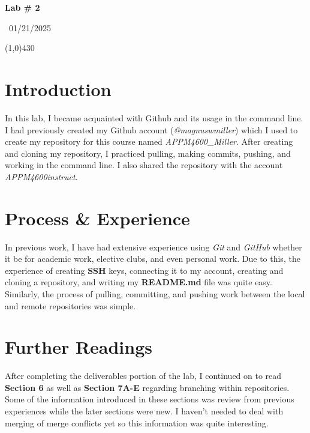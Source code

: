 \documentclass{article}
\begin{document}
\begin{center}
 \LARGE\bfseries Lab \# 2
\end{center}
\begin{center}
    ~01/21/2025~
\end{center}
 \line(1,0){430}

\section{Introduction}
In this lab, I became acquainted with Github and its usage in the command line. I had previously created my Github account (\textit{@magnuswmiller}) which I used to create my repository for this course named \textit{APPM4600\_Miller}. After creating and cloning my repository, I practiced pulling, making commits, pushing, and working in the command line. I also shared the repository with the account \textit{APPM4600instruct}.

\section{Process \& Experience}
In previous work, I have had extensive experience using \textit{Git} and \textit{GitHub} whether it be for academic work, elective clubs, and even personal work. Due to this, the experience of creating \textbf{SSH} keys, connecting it to my account, creating and cloning a repository, and writing my \textbf{README.md} file was quite easy. Similarly, the process of pulling, committing, and pushing work between the local and remote repositories was simple.

\section{Further Readings}
After completing the deliverables portion of the lab, I continued on to read \textbf{Section 6} as well as \textbf{Section 7A-E} regarding branching within repositories. Some of the information introduced in these sections was review from previous experiences while the later sections were new. I haven't needed to deal with merging of merge conflicts yet so this information was quite interesting.
\end{document}
